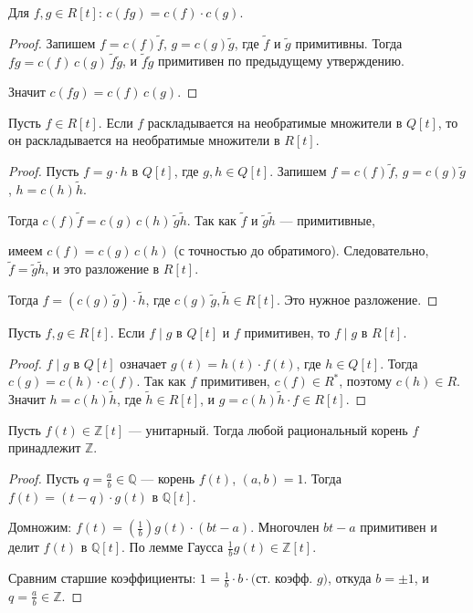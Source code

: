 \begin{stmt}
	Для $f, g \in R[t]$: $c(fg) = c(f) \cdot c(g)$.

	\begin{proof}
		Запишем $f = c(f)\tilde{f}$, $g = c(g)\tilde{g}$, где $\tilde{f}$ и $\tilde{g}$ примитивны.
        Тогда $fg = c(f)\,c(g)\,\tilde{f}\tilde{g}$, и $\tilde{f}\tilde{g}$ примитивен по предыдущему утверждению.

        Значит $c(fg) = c(f)\,c(g)$.
	\end{proof}
\end{stmt}


\begin{stmt}
	Пусть $f \in R[t]$. Если $f$ раскладывается на необратимые множители в $Q[t]$, то он раскладывается на необратимые множители в $R[t]$.

	\begin{proof}
		Пусть $f = g \cdot h$ в $Q[t]$, где $g, h \in Q[t]$. Запишем $f = c(f)\tilde{f}$, $g = c(g)\tilde{g} $,
  $h = c(h)\tilde{h}$.

		Тогда $c(f)\tilde{f} = c(g)\,c(h)\,\tilde{g}\tilde{h}$. Так как $\tilde{f}$ и $\tilde{g}\tilde{h}$ --- примитивные,

        имеем $c(f) = c(g)\,c(h)$ (с точностью до обратимого). Следовательно, $\tilde{f} = \tilde{g}\tilde{h}$,
        и это разложение в $R[t]$.

		Тогда $f = (c(g)\,\tilde{g}) \cdot \tilde{h}$, где $c(g)\,\tilde{g}, \tilde{h} \in R[t]$. Это нужное разложение.

	\end{proof}
\end{stmt}


\begin{lemma}[Гаусса]
	Пусть $f, g \in R[t]$. Если $f \mid g$ в $Q[t]$ и $f$ примитивен, то $f \mid g$ в $R[t]$.

	\begin{proof}
		$f \mid g$ в $Q[t]$ означает $g(t) = h(t) \cdot f(t)$, где $h \in Q[t]$. Тогда $c(g) = c(h) \cdot c(f)$.
        Так как $f$ примитивен, $c(f) \in R^*$, поэтому $c(h) \in R$. Значит $h = c(h)\tilde{h}$, где
        $\tilde{h} \in R[t]$,
        и $g = c(h)\tilde{h} \cdot f \in R[t]$.
	\end{proof}
\end{lemma}


\begin{cor}
	Пусть $f(t) \in \mathbb{Z}[t]$ --- унитарный. Тогда любой рациональный корень $f$ принадлежит $\mathbb{Z}$.

	\begin{proof}
		Пусть $q = \frac{a}{b} \in \mathbb{Q}$ --- корень $f(t)$, $(a, b) = 1$. Тогда $f(t) = (t - q) \cdot g(t)$ в
  $\mathbb{Q}[t]$.

		Домножим: $f(t) = \left(\frac{1}{b}\right) g(t) \cdot (bt - a)$. Многочлен $bt - a$ примитивен и делит
  $f(t)$ в $\mathbb{Q}[t]$.
        По лемме Гаусса $\frac{1}{b}g(t) \in \mathbb{Z}[t]$.

		Сравним старшие коэффициенты: $1 = \frac{1}{b} \cdot b \cdot \text{(ст. коэфф. } g)$,
        откуда $b = \pm 1$, и $q = \frac{a}{b} \in \mathbb{Z}$.
	\end{proof}
\end{cor}



